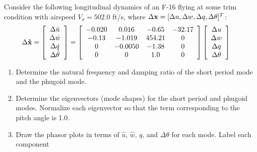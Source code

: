 

\begin{question}
    Consider the following longitudinal dynamics of an F-16 flying at some trim condition with airspeed $V_a = 502.0$ ft/s, where $\Delta{\bf x} = [{\Delta u}, {\Delta w}, {\Delta q}, {\Delta \theta}]^T$:
    \begin{align*}
    \Delta {\bf \dot{x}} = 
    \left[ \begin{array}{c} 
    \Delta \dot{u} \\
    \Delta \dot{w} \\
    \Delta \dot{q} \\
    \Delta \dot{\theta}
    \end{array} \right]
    &=
    \left[ \begin{array}{cccc}
    	 -0.020 &   0.016  & -0.65  & -32.17 \\
       -0.13  & -1.019   &       454.21 & 0\\
                0 &  -0.0050     &     -1.38	 & 0   \\
             0    &     0     &     1.0 & 0 \end{array} \right]
    \left[ \begin{array}{c} 
    \Delta u \\
    \Delta w \\
    \Delta q \\
    \Delta \theta
    \end{array} \right]
    \end{align*}
    \begin{enumerate}[label=(\alph*)]
    \item Determine the natural frequency and damping ratio of the short period mode and the phugoid mode.
    \item Determine the eigenvectors (mode shapes) for the short period and phugoid modes. Normalize each eigenvector so that the term corresponding to the pitch angle is 1.0.
    \item Draw the phasor plots in terms of $\hat{u}$, $\hat{w}$, $q$, and $\Delta \theta$ for each mode. Label each component
    \end{enumerate}


\end{question}
